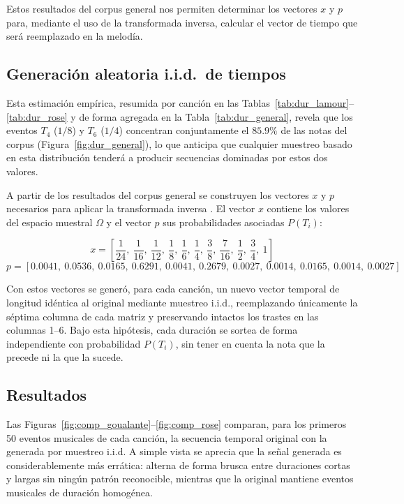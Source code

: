 \documentclass{article}
\theoremstyle{plain}
\theoremstyle{definition}
\begin{document}

Estos resultados del corpus general nos permiten determinar los vectores $x$ y $p$ para, mediante el uso de la transformada inversa, calcular el vector de tiempo que será reemplazado en la melodía.


\subsection*{Generación aleatoria i.i.d.\ de tiempos}

Esta estimación empírica, resumida por canción en las
Tablas~\ref{tab:dur_lamour}--\ref{tab:dur_rose} y de forma agregada en la
Tabla~\ref{tab:dur_general}, revela que los eventos $T_4$ ($1/8$) y $T_6$ ($1/4$)
concentran conjuntamente el $85.9\%$ de las notas del corpus
(Figura~\ref{fig:dur_general}), lo que anticipa que cualquier muestreo basado en esta
distribución tenderá a producir secuencias dominadas por estos dos valores.

A partir de los resultados del corpus general se construyen los vectores $x$ y $p$
necesarios para aplicar la transformada inversa \cite{bertsekas}. El vector $x$ contiene
los valores del espacio muestral $\Omega$ y el vector $p$ sus probabilidades asociadas
$P(T_i)$:

\[
	x = \left[\frac{1}{24},\ \frac{1}{16},\ \frac{1}{12},\ \frac{1}{8},\ \frac{1}{6},\
		\frac{1}{4},\ \frac{3}{8},\ \frac{7}{16},\ \frac{1}{2},\ \frac{3}{4},\ 1\right]
\]
\[
	p = \left[0.0041,\ 0.0536,\ 0.0165,\ 0.6291,\ 0.0041,\ 0.2679,\ 0.0027,\ 0.0014,\
		0.0165,\ 0.0014,\ 0.0027\right]
\]

Con estos vectores se generó, para cada canción, un nuevo vector temporal de longitud
idéntica al original mediante muestreo i.i.d., reemplazando únicamente la séptima columna
de cada matriz y preservando intactos los trastes en las columnas 1--6. Bajo esta hipótesis,
cada duración se sortea de forma independiente con probabilidad $P(T_i)$, sin tener en
cuenta la nota que la precede ni la que la sucede.

\subsection*{Resultados}

Las Figuras~\ref{fig:comp_goualante}--\ref{fig:comp_rose} comparan, para los primeros 50 eventos musicales de cada canción, la secuencia temporal original con la generada por muestreo i.i.d. A simple
vista se aprecia que la señal generada es considerablemente más errática: alterna de forma
brusca entre duraciones cortas y largas sin ningún patrón reconocible, mientras que la
original mantiene eventos musicales de duración homogénea.
\end{document}
